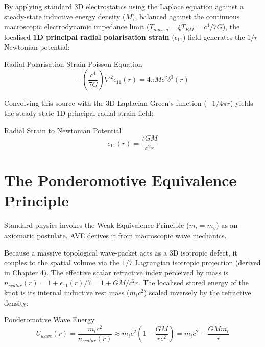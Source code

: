 By applying standard 3D electrostatics using the Laplace equation against a steady-state inductive energy density ($M$), balanced against the continuous macroscopic electrodynamic impedance limit ($T_{max,g} = \xi T_{EM} = c^{4}/7G$), the localised \textbf{1D principal radial polarisation strain} ($\epsilon_{11}$) field generates the $1/r$ Newtonian potential:

\begin{resultbox}{Radial Polarisation Strain Poisson Equation}
\begin{equation}
-\left(\frac{c^{4}}{7G}\right)\nabla^{2}\epsilon_{11}(r)=4\pi Mc^{2}\delta^{3}(r)
\end{equation}
\end{resultbox}

Convolving this source with the 3D Laplacian Green's function ($-1/4\pi r$) yields the steady-state 1D principal radial strain field:

\begin{resultbox}{Radial Strain to Newtonian Potential}
\begin{equation}
\epsilon_{11}(r)=\frac{7GM}{c^{2}r}
\end{equation}
\end{resultbox}

\section{The Ponderomotive Equivalence Principle}

Standard physics invokes the Weak Equivalence Principle ($m_i=m_g$) as an axiomatic postulate. AVE derives it from macroscopic wave mechanics.

Because a massive topological wave-packet acts as a 3D isotropic defect, it couples to the spatial volume via the $1/7$ Lagrangian isotropic projection (derived in Chapter 4). The effective scalar refractive index perceived by mass is $n_{scalar}(r)=1+\epsilon_{11}(r)/7=1+GM/c^{2}r$. The localised stored energy of the knot is its internal inductive rest mass ($m_i c^{2}$) scaled inversely by the refractive density:

\begin{resultbox}{Ponderomotive Wave Energy}
\begin{equation}
U_{wave}(r)=\frac{m_i c^{2}}{n_{scalar}(r)}\approx m_i c^{2}\left(1-\frac{GM}{rc^{2}}\right)=m_i c^{2}-\frac{GM m_i}{r}
\end{equation}
\end{resultbox}

